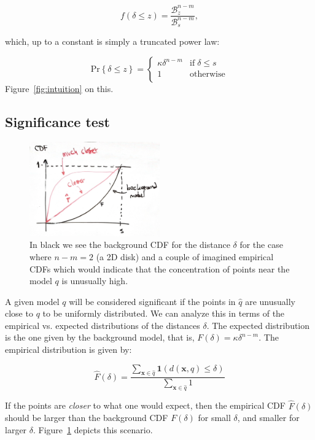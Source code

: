 \documentclass[a4page,11pt]{article}
\renewcommand{\vec}[1]{\mathbf{#1}}%
\newcommand{\set}[1]{\mathcal{#1}}%
\newcommand{\prob}[1]{\mathrm{Pr}\left\{#1\right\}}%
\newcommand{\ind}[1]{\mathbf{1}\left(#1\right)}%
\begin{document}
$$f(\delta \leq z) = \frac{\set{B}^{n-m}_z}{\set{B}^{n-m}_s},$$

which, up to a constant is simply a truncated power law: 

$$\prob{\delta \leq z} = 
\left\{
\begin{array}{cc}
\kappa\delta^{n-m} & \mathrm{if}\;\delta \leq s \\
1 &\mathrm{otherwise} \\
\end{array}
\right.
$$
Figure~\ref{fig:intuition} on this.


\subsection{Significance test}

\begin{figure}
\centering\includegraphics[width=0.5\textwidth]{significance}
\caption{\label{fig:significance} In black we see the background CDF for the distance $\delta$ for the case where $n-m=2$ (a 2D disk) and a couple of imagined empirical CDFs which would indicate that the concentration of points near the model $q$ is unusually high.}
\end{figure}


A given model $q$ will be considered significant if the points in $\hat{q}$ are unusually close to $q$ to be uniformly distributed. We can analyze this in terms of the empirical vs. expected  distributions of the distances $\delta$. The expected distribution is the one given by the background model, that is, $F(\delta) = \kappa \delta^{n-m}$. The empirical distribution is given by:

$$\hat{F}(\delta)=\frac{\sum_{\vec{x} \in \hat{q}} \ind{d(\vec{x},q) \leq \delta}}{\sum_{\vec{x} \in \hat{q}}1} $$

If the points are \emph{closer} to what one would expect, then the empirical CDF $\hat{F}(\delta)$  should be larger than the background CDF $F(\delta)$ for small $\delta$, and smaller for larger $\delta$. Figure~\ref{fig:significance} depicts this scenario.
\end{document}
